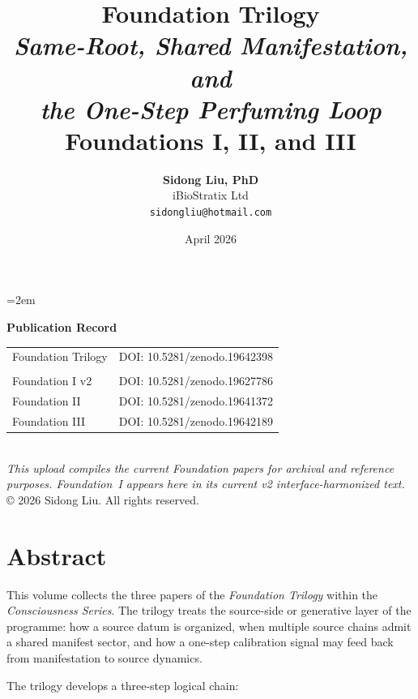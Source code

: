 \documentclass[12pt,a4paper,openany]{book}
\title{
  \vspace{-2cm}
  {\Huge\textbf{Foundation Trilogy}}\\[1cm]
  {\Large\textit{Same-Root, Shared Manifestation, and\\
  the One-Step Perfuming Loop}}\\[2cm]
  {\normalsize Foundations I, II, and III}
}
\author{
  \textbf{Sidong Liu, PhD}\\[0.5em]
  iBioStratix Ltd\\[0.3em]
  \texttt{sidongliu@hotmail.com}
}
\date{April 2026}
\begin{document}
\emergencystretch=2em
\raggedbottom
{}

\frontmatter
\maketitle

\newpage
\thispagestyle{empty}
\vspace*{\fill}
\begin{center}
\textbf{Publication Record}\\[2em]
\begin{tabular}{P{4.1cm}P{8.4cm}}
Foundation Trilogy & DOI: 10.5281/zenodo.19642398 \\
\\[-0.2em]
Foundation I v2 & DOI: 10.5281/zenodo.19627786 \\
Foundation II & DOI: 10.5281/zenodo.19641372 \\
Foundation III & DOI: 10.5281/zenodo.19642189 \\
\end{tabular}
\\[3em]
\textit{This upload compiles the current Foundation papers for
archival and reference purposes. Foundation~I appears here in its current
v2 interface-harmonized text.}
\\[2em]
\copyright{} 2026 Sidong Liu. All rights reserved.
\end{center}
\vspace*{\fill}

\chapter*{Abstract}

This volume collects the three papers of the \emph{Foundation Trilogy}
within the \emph{Consciousness Series}. The trilogy treats the
source-side or generative layer of the programme: how a source datum is
organized, when multiple source chains admit a shared manifest sector,
and how a one-step calibration signal may feed back from manifestation
to source dynamics.

The trilogy develops a three-step logical chain:
\end{document}
